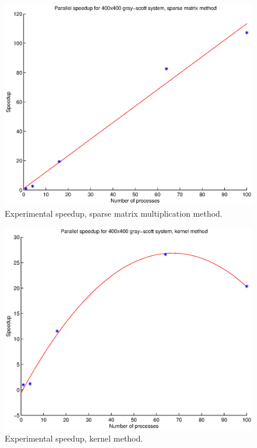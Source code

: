 \documentclass[a4paper,11pt]{article}
\begin{document}
\begin{figure}
  \centering
  \includegraphics[scale=0.6]{sparse}
    \caption{Experimental speedup, sparse matrix multiplication method.}
    \label{fig:sparse}
\end{figure}

\begin{figure}
  \centering
  \includegraphics[scale=0.6]{kernel}
    \caption{Experimental speedup, kernel method.}
    \label{fig:kernel}
\end{figure}
\end{document}
